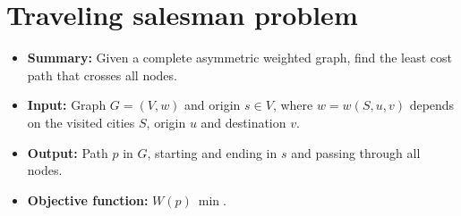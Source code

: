 \section{Traveling salesman problem} \label{algorithm-tsp}
\begin{itemize}
    \item \textbf{Summary:} Given a complete asymmetric weighted graph, find the least cost path that crosses all nodes. 
    \item \textbf{Input:} Graph $G=(V,w)$ and origin $s \in V$, where $w=w(S, u, v)$ depends on the visited cities $S$, origin $u$ and destination $v$.
    \item \textbf{Output:} Path $p$ in $G$, starting and ending in $s$ and passing through all nodes.
    \item \textbf{Objective function:} $W(p)~\min$.
\end{itemize}


